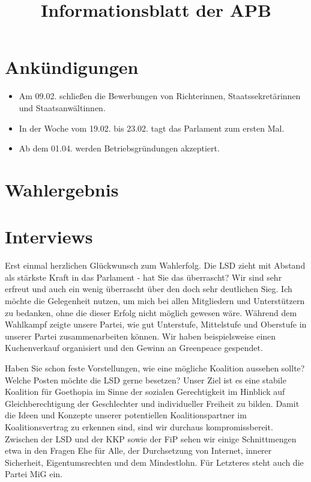 \documentclass{sasbase}
\begin{document}
\title{Informationsblatt der APB}

\setcounter{secnumdepth}{5}

\mytitle

\parensstyle

\section{Ankündigungen}
\begin{itemize}
    \item Am 09.02. schließen die Bewerbungen von Richterinnen, Staatssekretärinnen und Staatsanwältinnen.
    \item In der Woche vom 19.02. bis 23.02. tagt das Parlament zum ersten Mal.
    \item Ab dem 01.04. werden Betriebsgründungen akzeptiert.
\end{itemize}

\section{Wahlergebnis}

\section{Interviews}


\begin{question}{Erst einmal herzlichen Glückwunsch zum Wahlerfolg. Die LSD zieht mit Abstand als stärkste Kraft in das Parlament - hat  Sie das überrascht?}
    Wir sind sehr erfreut und auch ein wenig überrascht über den doch sehr deutlichen Sieg. 
    Ich möchte die Gelegenheit nutzen, um  mich  bei allen Mitgliedern und Unterstützern zu bedanken, ohne die dieser Erfolg nicht möglich gewesen wäre. 
    Während dem Wahlkampf  zeigte unsere Partei, wie gut Unterstufe, Mittelstufe und Oberstufe in unserer Partei zusammenarbeiten können.
    Wir haben beispielsweise einen Kuchenverkauf organisiert und den Gewinn an Greenpeace gespendet. 
\end{question}

\begin{question}{Haben Sie schon feste Vorstellungen, wie eine mögliche Koalition aussehen sollte? Welche Posten möchte die LSD gerne besetzen?}
    Unser Ziel ist es eine stabile Koalition für Goethopia im Sinne der sozialen Gerechtigkeit im Hinblick auf Gleichberechtigung der Geschlechter 
    und individueller Freiheit zu bilden. Damit die Ideen und Konzepte unserer potentiellen Koalitionspartner im Koalitionsvertrag zu erkennen sind, 
    sind wir durchaus kompromissbereit. Zwischen der LSD und der KKP sowie der FiP sehen wir einige Schnittmengen etwa in den Fragen Ehe für Alle, 
    der Durchsetzung von Internet, innerer Sicherheit, Eigentumsrechten und dem Mindestlohn. Für Letzteres steht auch die Partei MiG ein. 
\end{question}
\end{document}
